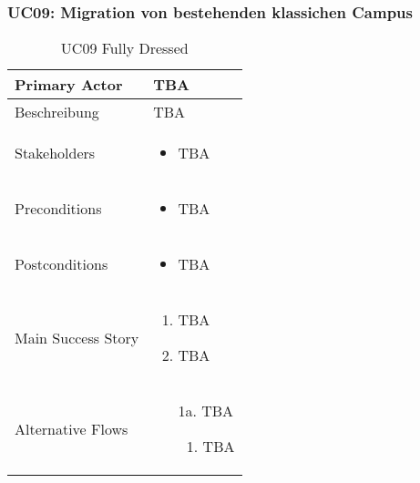 \subsubsection{UC09: Migration von bestehenden klassichen Campus}
\begin{table}[H]
	\centering
	\begin{tabularx}{\textwidth}{l | X}
		Primary Actor   & TBA       \\
		\hline
		Beschreibung   & TBA  \\ 
		\hline
		Stakeholders       & 
		\begin{itemize}
			\item TBA
		\end{itemize} \\ 
		Preconditions      &
		\begin{itemize}	
			\item TBA
		\end{itemize}  \\
		\hline
		Postconditions     & 
		\begin{itemize}	
			\item TBA
		\end{itemize}  \\
		\hline
		Main Success Story & 
		\begin{enumerate}
			\item TBA
			\item TBA
		\end{enumerate}
		\\
		\hline
		Alternative Flows  & 
		\begin{itemize}
			\item[1a.]  TBA
			\begin{enumerate}
				\item TBA
			\end{enumerate}
		\end{itemize}
	\end{tabularx}
	\caption{UC09 Fully Dressed}
	\label{tab:UC09}
\end{table}

